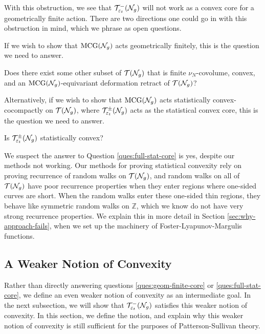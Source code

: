 With this obstruction, we see that $\mathcal{T}_{\varepsilon_t}^{-}(\mathcal{N}_g)$ will not work as a convex core for a geometrically finite action.
There are two directions one could go in with this obstruction in mind, which we phrase as open questions.

If we wish to show that $\mathrm{MCG}(\mathcal{N}_g)$ acts geometrically finitely, this is the question we need to answer.
\begin{question}
  \label{ques:geom-finite-core}
  Does there exist some other subset of $\mathcal{T}(\mathcal{N}_g)$ that is finite $\nu_N$-covolume, convex, and an $\mathrm{MCG}(\mathcal{N}_g)$-equivariant deformation retract of $\mathcal{T}(\mathcal{N}_g)$?
\end{question}

Alternatively, if we wish to show that $\mathrm{MCG}(\mathcal{N}_g)$ acts statistically convex-cocompactly on $\mathcal{T}(\mathcal{N}_g)$, where $\mathcal{T}_{\varepsilon_t}^{\pm}(\mathcal{N}_g)$ acts as the statistical convex core, this is the question we need to answer.

\begin{question}
  \label{ques:full-stat-core}
  Is $\mathcal{T}_{\varepsilon_t}^{\pm}(\mathcal{N}_g)$ statistically convex?
\end{question}

We suspect the answer to Question \ref{ques:full-stat-core} is yes, despite our methods not working.
Our methods for proving statistical convexity rely on proving recurrence of random walks on $\mathcal{T}(\mathcal{N}_g)$, and random walks on all of $\mathcal{T}(\mathcal{N}_g)$ have poor recurrence properties when they enter regions where one-sided curves are short.
When the random walks enter these one-sided thin regions, they behave like symmetric random walks on $\mathbb{Z}$, which we know do not have very strong recurrence properties.
We explain this in more detail in Section \ref{sec:why-approach-fails}, when we set up the machinery of Foster-Lyapunov-Margulis functions.

\subsection{A Weaker Notion of Convexity}
\label{sec:weak-noti-conv}

Rather than directly answering questions \ref{ques:geom-finite-core} or \ref{ques:full-stat-core}, we define an even weaker notion of convexity as an intermediate goal.
In the next subsection, we will show that $\mathcal{T}_{\varepsilon_t}^{-}(\mathcal{N}_g)$ satisfies this weaker notion of convexity.
In this section, we define the notion, and explain why this weaker notion of convexity is still sufficient for the purposes of Patterson-Sullivan theory.

